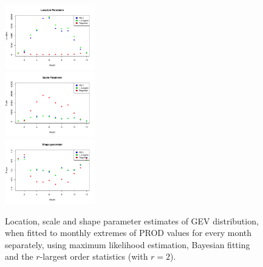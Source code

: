 \documentclass[10pt,conference,compsocconf]{IEEEtran}
\begin{document}
\par
\begin{figure}
	\centering
	\includegraphics[width=0.35\textwidth]{../plots/evolution_eta.pdf}\\
	\includegraphics[width=0.35\textwidth]{../plots/evolution_tao.pdf}\\
	\includegraphics[width=0.35\textwidth]{../plots/evolution_xi.pdf}\\
	\caption{Location, scale and shape parameter estimates of GEV distribution, when fitted to monthly extremes of PROD values for every month separately, using maximum likelihood estimation, Bayesian fitting and the $r$-largest order statistics (with $r=2$).}
	\label{fig:params}
\end{figure}
\end{document}
